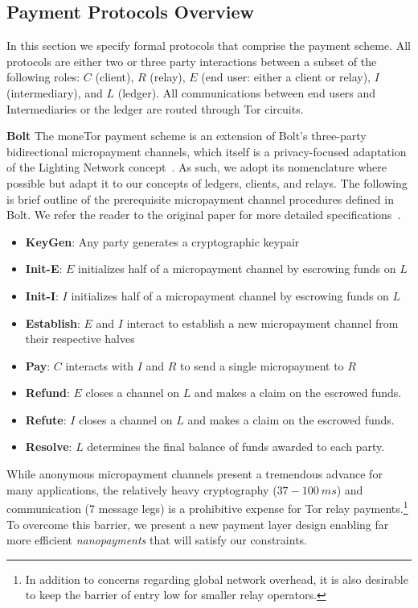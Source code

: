 \subsection{Payment Protocols Overview}
\label{sec:payment_overview}

In this section we specify formal protocols that comprise the payment scheme.
All protocols are either two or three party interactions between a subset of the
following roles: $C$ (client), $R$ (relay), $E$ (end user: either a client or
relay), $I$ (intermediary), and $L$ (ledger). All communications between end
users and Intermediaries or the ledger are routed through Tor circuits.

\textbf{Bolt} The moneTor payment scheme is an extension of Bolt's three-party
bidirectional micropayment channels, which itself is a privacy-focused
adaptation of the Lighting Network concept~\cite{poon16bitcoin}. As such, we
adopt its nomenclature where possible but adapt it to our concepts of ledgers,
clients, and relays. The following is brief outline of the prerequisite
micropayment channel procedures defined in Bolt. We refer the reader to the
original paper for more detailed specifications~\cite{green2017bolt}.

\begin{itemize}
\item \textbf{KeyGen}: Any party generates a cryptographic keypair
\item \textbf{Init-E}: $E$ initializes half of a micropayment channel by
  escrowing funds on $L$
\item \textbf{Init-I}: $I$ initializes half of a micropayment channel by
  escrowing funds on $L$
\item \textbf{Establish}: $E$ and $I$ interact to establish a new micropayment
  channel from their respective halves
\item \textbf{Pay}: $C$ interacts with $I$ and $R$ to send a single micropayment to $R$
\item \textbf{Refund}: $E$ closes a channel on $L$ and makes a claim on
  the escrowed funds.
\item \textbf{Refute}: $I$ closes a channel on $L$ and makes a claim on
  the escrowed funds.
\item \textbf{Resolve}: $L$ determines the final balance of funds awarded to
  each party.
\end{itemize}

While anonymous micropayment channels present a tremendous advance for many
applications, the relatively heavy cryptography ($37-100\ ms$) and communication
(7 message legs) is a prohibitive expense for Tor relay payments.\footnote{In
  addition to concerns regarding global network overhead, it is also desirable
  to keep the barrier of entry low for smaller relay operators.} To overcome
this barrier, we present a new payment layer design enabling far more efficient
\emph{nanopayments} that will satisfy our constraints.

